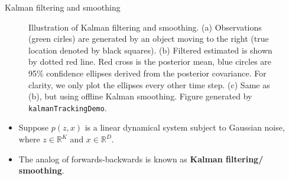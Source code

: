 \documentclass[10pt,mathserif]{beamer}
\begin{document}
\begin{frame}{Kalman filtering and smoothing}
\begin{figure}[h]
\centering     %
{}
\caption{Illustration of Kalman filtering and smoothing. (a) Observations (green cirles) are generated by an object moving to the right (true location denoted by black squares). (b) Filtered estimated is shown by dotted red line. Red cross is the posterior mean, blue circles are 95\% confidence ellipses derived from the posterior covariance. For clarity, we only plot the ellipses every other time step. (c) Same as (b), but using offline Kalman smoothing. Figure generated by \texttt{kalmanTrackingDemo}.}
\end{figure}

\begin{itemize}
    \item Suppose $p(z, x)$ is a linear dynamical system subject to Gaussian noise, where $z\in \mathbb{R}^K$ and $x\in \mathbb{R}^D$.
    \item The analog of forwards-backwards is known as \textbf{Kalman filtering/ smoothing}.
\end{itemize}
\end{frame}
\end{document}

